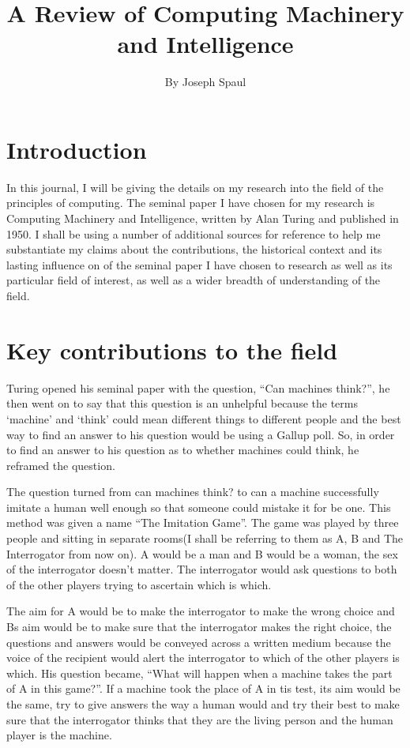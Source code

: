 \documentclass{article}
\title{A Review of Computing Machinery and Intelligence}
\author{By Joseph Spaul}
\begin{document}
\maketitle

\section{Introduction}

In this journal, I will be giving the details on my research into the field of the principles of computing. 
The seminal paper I have chosen for my research is Computing Machinery and Intelligence, written by Alan Turing 
and published in 1950. I shall be using a number of additional sources for reference to help me substantiate my 
claims about the contributions, the historical context and its lasting influence on of the seminal paper I have 
chosen to research as well as its particular field of interest, as well as a wider breadth of understanding of 
the field.

\section{Key contributions to the field}

Turing opened his seminal paper with the question, “Can machines think?”, he then went on to say that this 
question is an unhelpful because the terms ‘machine’ and ‘think’ could mean different things to different 
people and the best way to find an answer to his question would be using a Gallup poll. So, in order to find 
an answer to his question as to whether machines could think, he reframed the question. 

The question turned from can machines think? to can a machine successfully imitate a human well enough so that 
someone could mistake it for be one. This method was given a name “The Imitation Game”. The game was played by 
three people and sitting in separate rooms(I shall be referring to them as A, B and The Interrogator from now 
on). A would be a man and B would be a woman, the sex of the interrogator doesn’t matter. The interrogator would 
ask questions to both of the other players trying to ascertain which is which. 

The aim for A would be to make the interrogator to make the wrong choice and Bs aim would be to make sure that the interrogator makes the right choice, the questions and answers would be conveyed across a written medium because 
the voice of the recipient would alert the interrogator to which of the other players is which. His question 
became, “What will happen when a machine takes the part of A in this game?”. If a machine took the place of A in 
tis test, its aim would be the same, try to give answers the way a human would and try their best to make sure that 
the interrogator thinks that they are the living person and the human player is the machine. 
\end{document}
